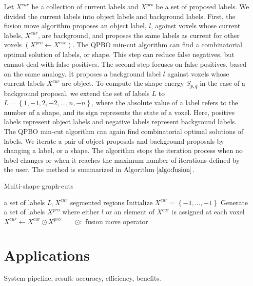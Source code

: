 \documentclass{SMBV12}
\begin{document}
Let $X^{cur}$ be a collection of current labels and $X^{pro}$ be a set of proposed labels. We divided the current labels into object labels and background labels. First, the fusion move algorithm proposes an object label, $l$, against voxels whose current labels, $X^{cur}$, are background, and proposes the same labels as current for other voxels $(X^{pro} \leftarrow X^{cur})$. The QPBO min-cut algorithm can find a combinatorial optimal solution of labels, or shape. This step can reduce false negatives, but cannot deal with false positives. The second step focuses on false positives, based on the same analogy. It proposes a background label $l$ against voxels whose current labels $X^{cur}$ are object. To compute the shape energy $S_{p,q}$ in the case of a background proposal, we extend the set of labels $L$ to $L = \left\lbrace 1, -1, 2, -2, ..., n, -n \right\rbrace$, where the absolute value of a label refers to the number of a shape, and its sign represents the state of a voxel. Here, positive labels represent object labels and negative labels represent background labels. The QPBO min-cut algorithm can again find combinatorial optimal solutions of labels. We iterate a pair of object proposals and background proposals by changing a label, or a shape. The algorithm stops the iteration process when no label changes or when it reaches the maximum number of iterations defined by the user. The method is summarized in Algorithm $\ref{algo:fusion}$.

\begin{algorithm}
\caption{Multi-shape graph-cuts}
\label{algo:fusion}
\begin{algorithmic}
\Require a set of labels $L, X^{cur}$
\Ensure segmented regions
\State Initialize $X^{cur} = \left\lbrace -1, ..., -1\right\rbrace $
\Repeat
		\State Generate a set of labels $X^{pro}$ where either $l$ or an element of $X^{cur}$ is assigned at each voxel
		\State $X^{cur} \leftarrow X^{cur} \odot X^{pro} \qquad \odot:$ fusion move operator \cite{lempitsky2010fusion}
	\EndFor 
{}
\end{algorithmic}
\end{algorithm}

\section{Applications}

System pipeline, result: accuracy, efficiency, benefits.
\end{document}
